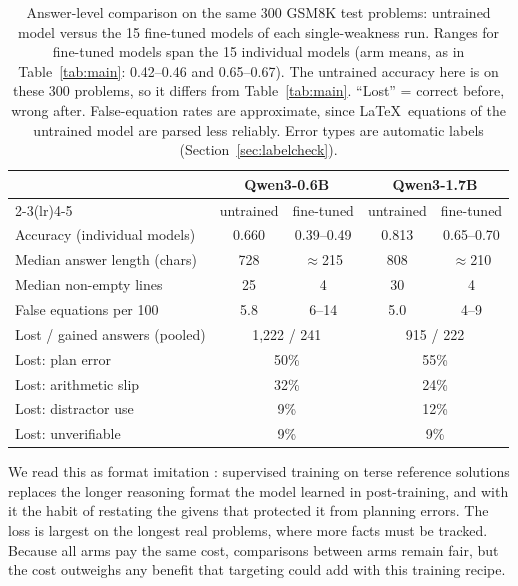 \documentclass[11pt]{article}
\begin{document}
\begin{table}[t]
\centering
\caption{Answer-level comparison on the same 300 GSM8K test problems: untrained model versus the 15 fine-tuned models
of each single-weakness run. Ranges for fine-tuned models span the 15 individual models (arm means, as in
Table~\ref{tab:main}: 0.42--0.46 and 0.65--0.67). The untrained accuracy here is on these 300 problems, so it differs
from Table~\ref{tab:main}. ``Lost'' = correct before, wrong after. False-equation rates are approximate, since
\LaTeX\ equations of the untrained model are parsed less reliably. Error types are automatic labels
(Section~\ref{sec:labelcheck}).}
\label{tab:cost}
\small
\begin{tabular}{lcccc}
\toprule
& \multicolumn{2}{c}{Qwen3-0.6B} & \multicolumn{2}{c}{Qwen3-1.7B} \\
\cmidrule(lr){2-3}\cmidrule(lr){4-5}
& untrained & fine-tuned & untrained & fine-tuned \\
\midrule
Accuracy (individual models)   & 0.660 & 0.39--0.49 & 0.813 & 0.65--0.70 \\
Median answer length (chars)   & 728   & $\approx$215 & 808 & $\approx$210 \\
Median non-empty lines         & 25    & 4 & 30 & 4 \\
False equations per 100        & 5.8   & 6--14 & 5.0 & 4--9 \\
Lost / gained answers (pooled) & \multicolumn{2}{c}{1{,}222 / 241} & \multicolumn{2}{c}{915 / 222} \\
Lost: plan error               & \multicolumn{2}{c}{50\%} & \multicolumn{2}{c}{55\%} \\
Lost: arithmetic slip          & \multicolumn{2}{c}{32\%} & \multicolumn{2}{c}{24\%} \\
Lost: distractor use           & \multicolumn{2}{c}{9\%}  & \multicolumn{2}{c}{12\%} \\
Lost: unverifiable             & \multicolumn{2}{c}{9\%}  & \multicolumn{2}{c}{9\%} \\
\bottomrule
\end{tabular}
\end{table}

We read this as format imitation \citep{zhou2023lima,li2025structure}: supervised training on terse reference solutions
replaces the longer reasoning format the model learned in post-training, and with it the habit of restating the givens
that protected it from planning errors. The loss is largest on the longest real problems, where more facts must be
tracked. Because all arms pay the same cost, comparisons between arms remain fair, but the cost outweighs any benefit
that targeting could add with this training recipe.
\end{document}
